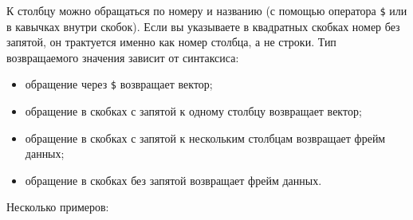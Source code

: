 \documentclass[]{book}
\providecommand{\tightlist}{%
  \setlength{\itemsep}{0pt}\setlength{\parskip}{0pt}}
\begin{document}
К столбцу можно обращаться по номеру и названию (с помощью оператора
\texttt{\$} или в кавычках внутри скобок). Если вы указываете в
квадратных скобках номер без запятой, он трактуется именно как номер
столбца, а не строки. Тип возвращаемого значения зависит от синтаксиса:

\begin{itemize}
\tightlist
\item
  обращение через \texttt{\$} возвращает вектор;
\item
  обращение в скобках с запятой к одному столбцу возвращает вектор;
\item
  обращение в скобках с запятой к нескольким столбцам возвращает фрейм
  данных;
\item
  обращение в скобках без запятой возвращает фрейм данных.
\end{itemize}

Несколько примеров:
\end{document}
